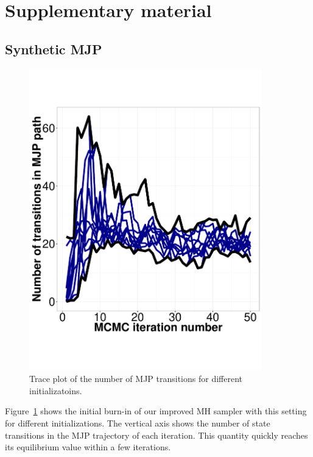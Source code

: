 \section{Supplementary material}

\subsection{Synthetic MJP}

  \begin{figure}%
  \centering
  \begin{minipage}[hp]{0.45\linewidth}
  \centering
    \includegraphics [width=0.90\textwidth, angle=0]{figs/exp3_k2_path_transition.pdf}
      \end{minipage}
    \caption{Trace plot of the number of MJP transitions for different initializatoins.}
	\label{fig:Transition_exp}
  \end{figure}

Figure~\ref{fig:Transition_exp} shows the initial burn-in of our improved MH 
sampler with this setting for different initializations. The vertical axis 
shows the number of state transitions in the MJP trajectory of each iteration. 
This quantity quickly reaches its equilibrium value within a few iterations.\\

